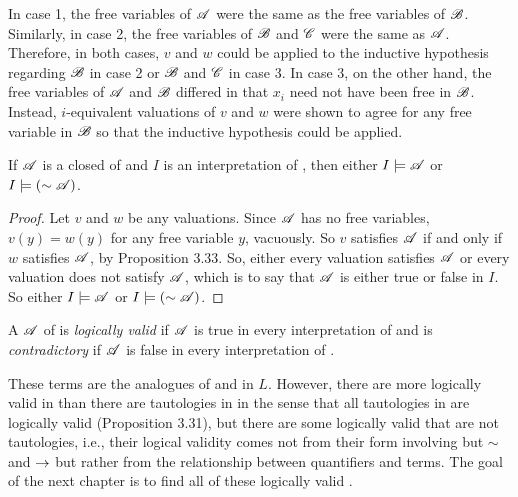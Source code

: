 \begin{proposition}
  \note{} In case 1, the free variables of \(\mathscr{A}\) were the same as the free variables of \(\mathscr{B}\). Similarly, in case 2, the free variables of \(\mathscr{B}\) and \(\mathscr{C}\) were the same as \(\mathscr{A}\). Therefore, in both cases, \(v\) and \(w\) could be applied to the inductive hypothesis regarding \(\mathscr{B}\) in case 2 or \(\mathscr{B}\) and \(\mathscr{C}\) in case 3. In case 3, on the other hand, the free variables of \(\mathscr{A}\) and \(\mathscr{B}\) differed in that \(x_i\) need not have been free in \(\mathscr{B}\). Instead, \(i\)-equivalent valuations of \(v\) and \(w\) were shown to agree for any free variable in \(\mathscr{B}\) so that the inductive hypothesis could be applied.
\end{proposition}

\begin{corollary}
  If \(\mathscr{A}\) is a closed \wf{} of \cl{} and \(I\) is an interpretation of \cl{}, then either \(I \models \mathscr{A}\) or \(I \models (\sim \mathscr{A})\).

  \begin{proof}
    Let \(v\) and \(w\) be any valuations. Since \(\mathscr{A}\) has no free variables, \(v(y) = w(y)\) for any free variable \(y\), vacuously. So \(v\) satisfies \(\mathscr{A}\) if and only if \(w\) satisfies \(\mathscr{A}\), by Proposition 3.33. So, either every valuation satisfies \(\mathscr{A}\) or every valuation does not satisfy \(\mathscr{A}\), which is to say that \(\mathscr{A}\) is either true or false in \(I\). So either \(I \models \mathscr{A}\) or \(I \models (\sim\mathscr{A})\).
  \end{proof}
\end{corollary}

\begin{definition}
  A \wf{} \(\mathscr{A}\) of \cl{} is \textit{logically valid} if \(\mathscr{A}\) is true in every interpretation of \cl{} and is \textit{contradictory} if \(\mathscr{A}\) is false in every interpretation of \cl{}.
\end{definition}

These terms are the analogues of  and  in \(L\). However, there are more logically valid \wfs{} in \cl{} than there are tautologies in \cl{} in the sense that all tautologies in \cl{} are logically valid (Proposition 3.31), but there are some logically valid \wfs{} that are not tautologies, i.e., their logical validity comes not from their form involving but \(\sim\) and \(\rightarrow\) but rather from the relationship between quantifiers and terms. The goal of the next chapter is to find all of these logically valid \wfs{}.

\solutions{}

